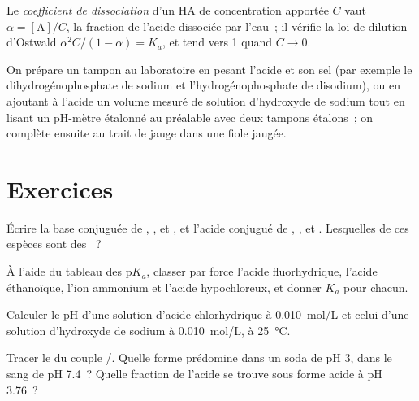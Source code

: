 \begin{definition}\label{def:b1:predominant-reaction:dissociation}
Le \emph{coefficient de dissociation} d'un 
HA de concentration apportée $C$ vaut $\alpha = [\mathrm{A}]/C$, la
fraction de l'acide dissociée par l'eau~; il vérifie la loi de dilution
d'Ostwald $\alpha^2C/(1 - \alpha) = K_a$, et tend vers 1 quand $C \to 0$.
\end{definition}

\begin{inthelab}
On prépare un tampon au laboratoire en pesant l'acide et son sel (par
exemple le dihydrogénophosphate de sodium et l'hydrogénophosphate de
disodium), ou en ajoutant à l'acide un volume mesuré de solution
d'hydroxyde de sodium tout en lisant un pH-mètre étalonné au préalable
avec deux tampons étalons~; on complète ensuite au trait de jauge dans
une fiole jaugée.
\end{inthelab}

\section{Exercices}

\begin{exercise}[$\star$]\label{exo:b1:predominant-reaction:1}
Écrire la base conjuguée de , ,  et
, et l'acide conjugué de , ,  et
. Lesquelles de ces espèces sont des ~?
\end{exercise}

\begin{exercise}[$\star$]\label{exo:b1:predominant-reaction:2}
À l'aide du tableau des $\mathrm{p}K_a$, classer par force l'acide
fluorhydrique, l'acide éthanoïque, l'ion ammonium et l'acide
hypochloreux, et donner $K_a$ pour chacun.
\end{exercise}

\begin{exercise}[$\star$]\label{exo:b1:predominant-reaction:3}
Calculer le pH d'une solution d'acide chlorhydrique à \qty{0.010}{mol/L}
et celui d'une solution d'hydroxyde de sodium à \qty{0.010}{mol/L}, à
\qty{25}{\celsius}.
\end{exercise}

\begin{exercise}[$\star$]\label{exo:b1:predominant-reaction:4}
Tracer le  du couple /.
Quelle forme prédomine dans un soda de pH 3, dans le sang de pH 7.4~?
Quelle fraction de l'acide se trouve sous forme acide à pH 3.76~?
\end{exercise}

